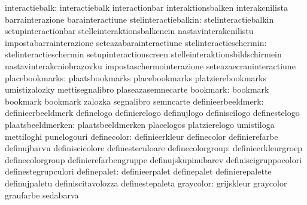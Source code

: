                   interactiebalk: interactiebalk                   interactionbar
                                  interaktionsbalken               interakcnilista
                                  barrainterazione                 barainteractiune
            stelinteractiebalkin: stelinteractiebalkin             setupinteractionbar
                                  stelleinteraktionsbalkenein      nastavinterakcnilistu
                                  impostabarrainterazione          seteazabarainteractiune
          stelinteractieschermin: stelinteractieschermin           setupinteractionscreen
                                  stelleinteraktionsbildschirmein  nastavinterakcniobrazovku
                                  impostaschermointerazione        seteazaecraninteractiune
                  placebookmarks: plaatsbookmarks                  placebookmarks
                                  platzierebookmarks               umistizalozky
                                  mettisegnalibro                  plaseazasemnecarte
                        bookmark: bookmark                         bookmark
                                  bookmark                         zalozka
                                  segnalibro                       semncarte
              definieerbeeldmerk: definieerbeeldmerk               definelogo
                                  definierelogo                    definujlogo
                                  definiscilogo                    definestelogo
               plaatsbeeldmerken: plaatsbeeldmerken                placelogos
                                  platzierelogo                    umistiloga
                                  mettiloghi                       punelogouri
                    definecolor:  definieerkleur                   definecolor
                                  definierefarbe                   definujbarvu
                                  definiscicolore                  definesteculoare
               definecolorgroup:  definieerkleurgroep              definecolorgroup
                                  definierefarbengruppe            definujskupinubarev
                                  definiscigruppocolori            definestegrupculori
                    definepalet:  definieerpalet                   definepalet
                                  definierepalette                 definujpaletu
                                  definiscitavolozza               definestepaleta
                      graycolor:  grijskleur                       graycolor
                                  graufarbe                        sedabarva
